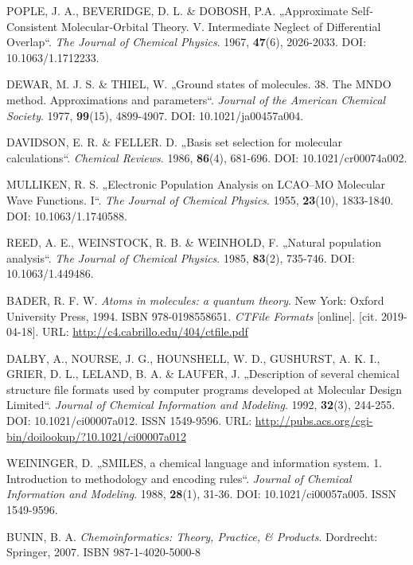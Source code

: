 \begin{thebibliography}{10}
POPLE, J. A., BEVERIDGE, D. L. \& DOBOSH, P.A. „Approximate Self‐Consistent Molecular‐Orbital Theory. V. Intermediate Neglect of Differential Overlap“. \textit{The Journal of Chemical Physics}. 1967, \textbf{47}(6), 2026-2033. DOI: 10.1063/1.1712233.

DEWAR, M. J. S. \& THIEL, W. „Ground states of molecules. 38. The MNDO method. Approximations and parameters“. \textit{Journal of the American Chemical Society}. 1977, \textbf{99}(15), 4899-4907. DOI: 10.1021/ja00457a004.

DAVIDSON, E. R. \& FELLER. D. „Basis set selection for molecular calculations“. \textit{Chemical Reviews}. 1986, \textbf{86}(4), 681-696. DOI: 10.1021/cr00074a002. 

MULLIKEN, R. S. „Electronic Population Analysis on LCAO–MO Molecular Wave Functions. I“. \textit{The Journal of Chemical Physics}. 1955, \textbf{23}(10), 1833-1840. DOI: 10.1063/1.1740588. 

REED, A. E., WEINSTOCK, R. B. \& WEINHOLD, F. „Natural population analysis“. \textit{The Journal of Chemical Physics}. 1985, \textbf{83}(2), 735-746. DOI: 10.1063/1.449486.

BADER, R. F. W. \textit{Atoms in molecules: a quantum theory}. New York: Oxford University Press, 1994. ISBN 978-0198558651.
\textit{CTFile Formats} [online]. [cit. 2019-04-18]. URL: \url{http://c4.cabrillo.edu/404/ctfile.pdf}

DALBY, A., NOURSE, J. G., HOUNSHELL, W. D., GUSHURST, A. K. I., GRIER, D. L., LELAND, B. A. \& LAUFER, J. „Description of several chemical structure file formats used by computer programs developed at Molecular Design Limited“. \textit{Journal of Chemical Information and Modeling}. 1992, \textbf{32}(3), 244-255. DOI: 10.1021/ci00007a012. ISSN 1549-9596. URL: \url{http://pubs.acs.org/cgi-bin/doilookup/?10.1021/ci00007a012}

WEININGER, D. „SMILES, a chemical language and information system. 1. Introduction to methodology and encoding rules“. \textit{Journal of Chemical Information and Modeling}. 1988, \textbf{28}(1), 31-36. DOI: 10.1021/ci00057a005. ISSN 1549-9596.

BUNIN, B. A. \textit{Chemoinformatics: Theory, Practice, \& Products}. Dordrecht: Springer, 2007. ISBN 987-1-4020-5000-8


\end{thebibliography}
